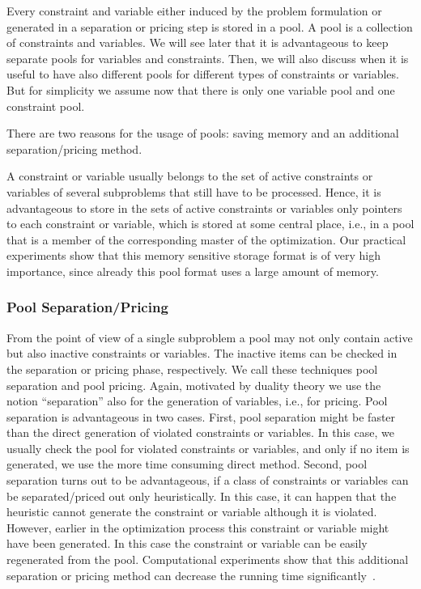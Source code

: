 Every constraint and variable either induced by the problem formulation
or generated in a separation or pricing step is stored in a pool.
A pool is a collection of constraints and variables. We will see later
that it is advantageous to keep separate pools for variables and constraints.
Then, we will also discuss when it is useful to have also different
pools for different types of constraints or variables. But for simplicity
we assume now that there is only one variable pool and one constraint pool.

There are two reasons for the usage of pools: saving memory
and an additional separation/pricing method.

A constraint or variable usually belongs to the set of active constraints
or variables of several subproblems that still have to be processed.
Hence, it is advantageous to store in the sets of active
constraints or variables only pointers to each constraint or variable,
which is stored at some central place, i.e., in a pool that is a member
of the corresponding master of the optimization. Our practical experiments
show that this memory sensitive storage format is of very high importance,
since already this pool format uses a large amount of memory.

\subsubsection{Pool Separation/Pricing}

From the point of view of a single subproblem a pool may not only contain
active but also inactive constraints or variables. The inactive items
can be checked in the separation or pricing phase, respectively.
We call these techniques pool separation and pool pricing.
Again, motivated by duality theory we use the notion ``separation'' also
for the generation of variables, i.e., for pricing.
Pool separation is advantageous in two cases. First, pool separation might be
faster than the direct generation of violated constraints or variables.
In this case, we usually check the pool for violated constraints or
variables, and only if no item is generated, we use the more time
consuming direct method. 
Second, pool separation turns out to
be advantageous, if a class of constraints or variables can
be separated/priced out only heuristically. In this case, it can
happen that the heuristic cannot generate the constraint or
variable although it is violated. However, earlier in the optimization
process this constraint or variable might have been generated. In this
case the constraint or variable can be easily regenerated from the pool.
Computational experiments show that this additional separation or
pricing method can decrease the running time significantly~\cite{JRT94}.

